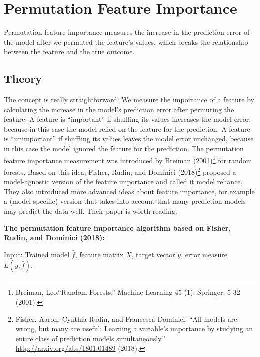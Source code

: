 \documentclass[
  10pt,
]{scrbook}
\begin{document}
\newpage

\hypertarget{feature-importance}{%
\section{Permutation Feature Importance}\label{feature-importance}}

Permutation feature importance measures the increase in the prediction error of the model after we permuted the feature's values, which breaks the relationship between the feature and the true outcome.

\hypertarget{theory-3}{%
\subsection{Theory}\label{theory-3}}

The concept is really straightforward:
We measure the importance of a feature by calculating the increase in the model's prediction error after permuting the feature.
A feature is ``important'' if shuffling its values increases the model error, because in this case the model relied on the feature for the prediction.
A feature is ``unimportant'' if shuffling its values leaves the model error unchanged, because in this case the model ignored the feature for the prediction.
The permutation feature importance measurement was introduced by Breiman (2001)\footnote{Breiman, Leo.``Random Forests.'' Machine Learning 45 (1). Springer: 5-32 (2001).} for random forests.
Based on this idea, Fisher, Rudin, and Dominici (2018)\footnote{Fisher, Aaron, Cynthia Rudin, and Francesca Dominici. ``All models are wrong, but many are useful: Learning a variable's importance by studying an entire class of prediction models simultaneously.'' \url{http://arxiv.org/abs/1801.01489} (2018).} proposed a model-agnostic version of the feature importance and called it model reliance.
They also introduced more advanced ideas about feature importance, for example a (model-specific) version that takes into account that many prediction models may predict the data well.
Their paper is worth reading.

\textbf{The permutation feature importance algorithm based on Fisher, Rudin, and Dominici (2018):}

Input: Trained model \(\hat{f}\), feature matrix \(X\), target vector \(y\), error measure \(L(y,\hat{f})\).
\end{document}
